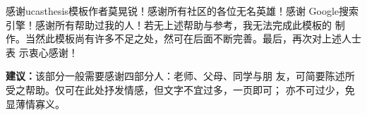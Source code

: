 \begin{acknowledgement}
	感谢ucasthesis模板作者莫晃锐！感谢所有社区的各位无名英雄！感谢
	Google搜索引擎！感谢所有帮助过我的人！若无上述帮助与参考，我无法完成此模板的
	制作。当然此模板尚有许多不足之处，然可在后面不断完善。最后，再次对上述人士表
	示衷心感谢！
	
	\begin{leftbar}
		\noindent\textbf{建议：}该部分一般需要感谢四部分人：老师、父母、同学与朋
		友，可简要陈述所受之帮助。仅可在此处抒发情感，但文字不宜过多，一页即可；
		亦不可过少，免显薄情寡义。
	\end{leftbar}
\end{acknowledgement}